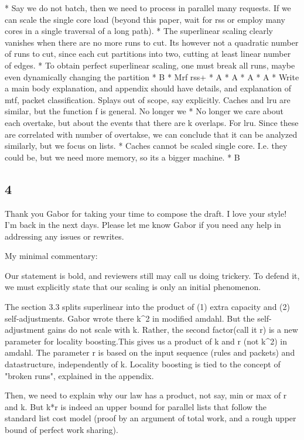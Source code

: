 * Say we do not batch, then we need to process in parallel many requests. If we can scale the single core load (beyond this paper, wait for rss or employ many cores in a single traversal of a long path).
* The superlinear scaling clearly vanishes when there are no more runs to cut. Its however not a quadratic number of runs to cut, since each cut partitions into two, cutting at least linear number of edges.
* To obtain perfect superlinear scaling, one must break all runs, maybe even dynamically changing the partition
* B
* Mrf rss+
* A
* A
* A
* A
* Write a main body explanation, and appendix  should have details, and explanation of mtf, packet classification. Splays out of scope, say explicitly. Caches and lru are similar, but the function f is general. No longer we
* No longer we care about each overtake, but about the events that there are k overlaps. For lru. Since these are correlated with number of overtakse, we can conclude that it can be analyzed similarly, but we focus on lists.
* Caches cannot be scaled single core. I.e. they could be, but we need more memory, so its a bigger machine.
* B

\subsection{4}


Thank you Gabor for taking your time to compose the draft. I love your style! I'm back in the next days. Please let me know Gabor if you need any help in addressing any issues or rewrites.

My minimal commentary:


Our statement is bold, and reviewers still may call us doing trickery. To defend it, we must explicitly state that our scaling is only an initial phenomenon.

The section 3.3 splits superlinear into the product  of (1) extra  capacity and (2) self-adjustments. Gabor wrote there k^2 in modified amdahl. But the self-adjustment gains do not scale with k. Rather, the second factor(call it r) is a new parameter for locality boosting.This gives us a product of k and r (not k^2) in amdahl. The parameter  r is based on the input sequence (rules and packets) and datastructure, independently of k. Locality boosting is tied to the concept of "broken runs", explained in the appendix.

Then, we need to explain why our law has a product, not say, min or max of r and k. But k*r is indeed an upper bound for parallel lists that follow the standard list cost model  (proof by an argument of total work, and a rough upper bound of perfect work sharing).

